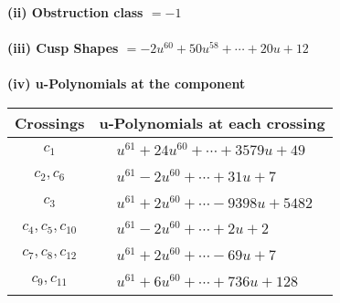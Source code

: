 \documentclass[1p]{elsarticle_modified}
\theoremstyle{definition}
\begin{document}
\flushleft \textbf{(ii) Obstruction class $= -1$}\\~\\
\flushleft \textbf{(iii) Cusp Shapes $= -2 u^{60}+50 u^{58}+\cdots+20 u+12$}\\~\\
\newpage\renewcommand{\arraystretch}{1}
\flushleft \textbf{(iv) u-Polynomials at the component}\newline \\
\begin{tabular}{m{50pt}|m{274pt}}
Crossings & \hspace{64pt}u-Polynomials at each crossing \\
\hline $$\begin{aligned}c_{1}\end{aligned}$$&$\begin{aligned}
&u^{61}+24 u^{60}+\cdots+3579 u+49
\end{aligned}$\\
\hline $$\begin{aligned}c_{2},c_{6}\end{aligned}$$&$\begin{aligned}
&u^{61}-2 u^{60}+\cdots+31 u+7
\end{aligned}$\\
\hline $$\begin{aligned}c_{3}\end{aligned}$$&$\begin{aligned}
&u^{61}+2 u^{60}+\cdots-9398 u+5482
\end{aligned}$\\
\hline $$\begin{aligned}c_{4},c_{5},c_{10}\end{aligned}$$&$\begin{aligned}
&u^{61}-2 u^{60}+\cdots+2 u+2
\end{aligned}$\\
\hline $$\begin{aligned}c_{7},c_{8},c_{12}\end{aligned}$$&$\begin{aligned}
&u^{61}+2 u^{60}+\cdots-69 u+7
\end{aligned}$\\
\hline $$\begin{aligned}c_{9},c_{11}\end{aligned}$$&$\begin{aligned}
&u^{61}+6 u^{60}+\cdots+736 u+128
\end{aligned}$\\
\hline
\end{tabular}\\~\\
\end{document}
